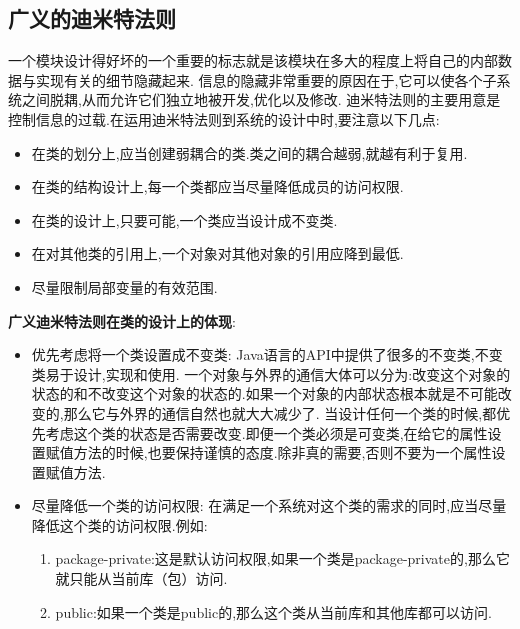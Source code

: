 \documentclass[../main.tex]{subfiles}
\begin{document}
\subsection{广义的迪米特法则}
一个模块设计得好坏的一个重要的标志就是该模块在多大的程度上将自己的内部数据与实现有关的细节隐藏起来.
信息的隐藏非常重要的原因在于,它可以使各个子系统之间脱耦,从而允许它们独立地被开发,优化以及修改.
迪米特法则的主要用意是控制信息的过载.在运用迪米特法则到系统的设计中时,要注意以下几点:
\begin{itemize}
  \item 在类的划分上,应当创建弱耦合的类.类之间的耦合越弱,就越有利于复用.
  \item 在类的结构设计上,每一个类都应当尽量降低成员的访问权限.
  \item 在类的设计上,只要可能,一个类应当设计成不变类.
  \item 在对其他类的引用上,一个对象对其他对象的引用应降到最低.
  \item 尽量限制局部变量的有效范围.
\end{itemize}
\textbf{广义迪米特法则在类的设计上的体现}:
\begin{itemize}
  \item 优先考虑将一个类设置成不变类:
    Java语言的API中提供了很多的不变类,不变类易于设计,实现和使用.
    一个对象与外界的通信大体可以分为:改变这个对象的状态的和不改变这个对象的状态的.如果一个对象的内部状态根本就是不可能改变的,那么它与外界的通信自然也就大大减少了.
    当设计任何一个类的时候,都优先考虑这个类的状态是否需要改变.即便一个类必须是可变类,在给它的属性设置赋值方法的时候,也要保持谨慎的态度.除非真的需要,否则不要为一个属性设置赋值方法.
  \item 尽量降低一个类的访问权限:
    在满足一个系统对这个类的需求的同时,应当尽量降低这个类的访问权限.例如:
    \begin{enumerate}
      \item package-private:这是默认访问权限,如果一个类是package-private的,那么它就只能从当前库（包）访问.
      \item public:如果一个类是public的,那么这个类从当前库和其他库都可以访问.
    \end{enumerate}
\end{itemize}
\end{document}
